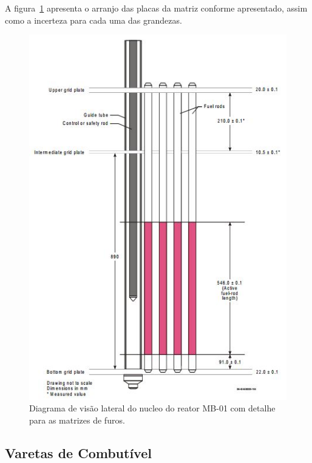 \documentclass[
	12pt,				%
	openany,			%
	twoside,			%
	a4paper,			%
	english,			%
	french,				%
	spanish,			%
	brazil				%
	]{abntex2}
\begin{document}
A figura~\ref{matrix} apresenta o arranjo das placas da matriz conforme apresentado,
assim como a incerteza para cada uma das grandezas.

\begin{figure}[htpb]
	\caption{\label{matrix}Diagrama de visão lateral do nucleo do reator MB-01 com detalhe para as matrizes de furos.}
	\begin{center}
	    \includegraphics[scale=0.75]{figs/Matrix_SIDE_VIEW}
	\end{center}
\end{figure}

\subsection{Varetas de Combutível}
\end{document}
